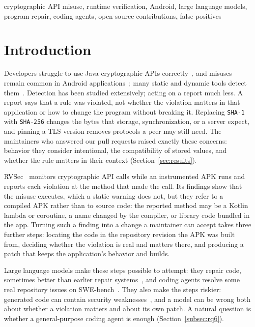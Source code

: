 \documentclass[conference]{IEEEtran}
\begin{document}
\begin{IEEEkeywords}
cryptographic API misuse, runtime verification, Android, large language
models, program repair, coding agents, open-source contributions, false
positives
\end{IEEEkeywords}

\section{Introduction}
\label{sec:introduction}

Developers struggle to use Java cryptographic APIs
correctly~\cite{nadi2016hoops}, and misuses remain common in Android
applications~\cite{egele2013crypto,costa2026rv4android}; many static and
dynamic tools detect them~\cite{krueger2017cognicrypt,krueger2021crysl,
rahaman2019cryptoguard,piccolboni2021crylogger,torres2023runtime}. Detection has
been studied extensively; acting on a report much less. A report says that a
rule was violated, not whether the violation matters in that application or how
to change the program without breaking it. Replacing \texttt{SHA-1} with
\texttt{SHA-256} changes the bytes that storage, synchronization, or a server
expect, and pinning a TLS version removes protocols a peer may still need. The
maintainers who answered our pull requests raised exactly these concerns:
behavior they consider intentional, the compatibility of stored values, and
whether the rule matters in their context (Section~\ref{sec:results}).

RVSec~\cite{torres2023runtime,costa2026rv4android} monitors cryptographic API calls while an
instrumented APK runs and reports each violation at the method that made the
call. Its findings show that the misuse executes, which a static warning does
not, but they refer to a compiled APK rather than to source code: the reported
method may be a Kotlin lambda or coroutine, a name changed by the compiler, or
library code bundled in the app. Turning such a finding into a change a
maintainer can accept takes three further steps: locating the code in the
repository revision the APK was built from, deciding whether the violation is
real and matters there, and producing a patch that keeps the application's
behavior and builds.

Large language models make these steps possible to attempt: they repair code,
sometimes better than earlier repair
systems~\cite{xia2023apr,zhang2023apimisuse}, and coding agents resolve some real
repository issues on SWE-bench~\cite{jimenez2024swebench,yang2024sweagent}. They also make the steps riskier: generated code can contain security
weaknesses~\cite{pearce2022asleep}, and a model can be
wrong both about whether a violation matters and about its own patch. A
natural question is whether a general-purpose coding agent is enough
(Section~\ref{subsec:rq6}).
\end{document}
